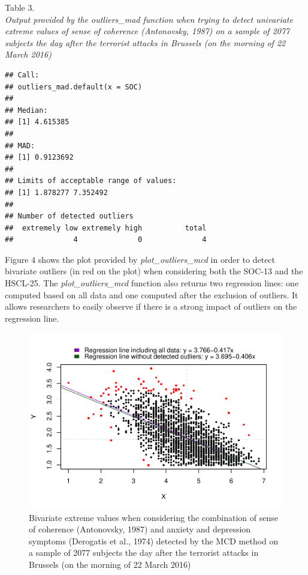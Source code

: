 \documentclass[man,floatsintext]{apa6}
\begin{document}
Table 3.\\
\emph{Output provided by the outliers\_mad function when trying to
detect univariate extreme values of sense of coherence (Antonovsky,
1987) on a sample of 2077 subjects the day after the terrorist attacks
in Brussels (on the morning of 22 March 2016)}

\begin{verbatim}
## Call:
## outliers_mad.default(x = SOC)
## 
## Median:
## [1] 4.615385
## 
## MAD:
## [1] 0.9123692
## 
## Limits of acceptable range of values:
## [1] 1.878277 7.352492
## 
## Number of detected outliers
##  extremely low extremely high          total 
##              4              0              4
\end{verbatim}

Figure 4 shows the plot provided by \emph{plot\_outliers\_mcd} in order
to detect bivariate outliers (in red on the plot) when considering both
the SOC-13 and the HSCL-25. The \emph{plot\_outliers\_mcd} function also
returns two regression lines: one computed based on all data and one
computed after the exclusion of outliers. It allows researchers to
easily observe if there is a strong impact of outliers on the regression
line.

\begin{figure}
\centering
\includegraphics{Outliers_files/figure-latex/MCDSOC-1.pdf}
\caption{\label{fig:MCDSOC}Bivariate extreme values when considering the
combination of sense of coherence (Antonovsky, 1987) and anxiety and
depression symptoms (Derogatis et al., 1974) detected by the MCD method
on a sample of 2077 subjects the day after the terrorist attacks in
Brussels (on the morning of 22 March 2016)}
\end{figure}
\end{document}
